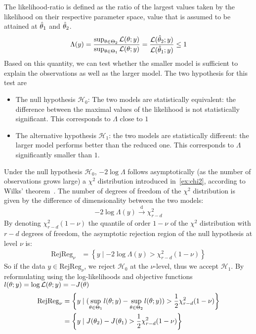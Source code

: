 \documentclass[../../Main_ManuscritThese.tex]{subfiles}
\begin{document}
The likelihood-ratio is defined as the ratio of the largest values
taken by the likelihood on their respective parameter space, value
that is assumed to be attained at $\hat{\theta}_1$ and $\hat{\theta}_2$.
\begin{equation}
  \label{eq:def_lik_ratio}
  \Lambda(y) = \frac{\sup_{\theta \in \Theta_2} \mathcal{L}(\theta ; y)}{\sup_{\theta \in \Theta_1} \mathcal{L}(\theta ; y)} = \frac{\mathcal{L}(\hat{\theta}_2 ; y)}{\mathcal{L}(\hat{\theta}_1 ; y)} \leq 1
\end{equation}
Based on this quantity, we can test whether the smaller model is
sufficient to explain the observations as well as the larger
model. The two hypothesis for this test are
\begin{itemize}
\item The null hypothesis $\mathcal{H}_0$: The two models are
  statistically equivalent: the difference between the maximal values
  of the likelihood is not statistically significant. This corresponds
  to $\Lambda$ close to $1$
\item The alternative hypothesis $\mathcal{H}_1$: the two models are
  statistically different: the larger model performs better than the
  reduced one. This corresponds to $\Lambda$ significantly smaller
  than $1$.
\end{itemize}
Under the null hypothesis $\mathcal{H}_0$, $-2 \log \Lambda$ follows
asymptotically (as the number of observations grows large) a $\chi^2$
distribution introduced in~\cref{ex:chi2}, according to Wilks'
theorem~\citep{wilks_large-sample_1938}. The number of degrees of
freedom of the $\chi^2$ distribution is given by the difference of
dimensionality between the two models:
\begin{equation}
  \label{eq:deviance_asymptotics}
  - 2 \log \Lambda(y) \xrightarrow[]{\mathrm{d}} \chi^2_{r-d}
\end{equation}
By denoting $\chi^2_{r-d}(1-\nu)$ the quantile of order $1-\nu$ of the
$\chi^2$ distribution with $r-d$ degrees of freedom, the asymptotic
rejection region of the null hypothesis at level $\nu$ is:
\begin{align}
  \mathrm{RejReg}_{\nu} &= \left\{y \mid -2 \log \Lambda(y) > \chi^2_{r-d}(1-\nu) \right\} \label{eq:LRT_rej_reg}
\end{align}
So if the data $y \in \mathrm{RejReg}_{\nu}$, we reject
$\mathcal{H}_0$ at the $\nu$-level, thus we accept $\mathcal{H}_1$.
By reformulating using the log-likelihoods and objective functions
$l(\theta;y) = \log \mathcal{L}(\theta;y) = - J(\theta)$
\begin{align}
  \mathrm{RejReg}_{\nu} &= \left\{ y \mid (\sup_{\theta\in\Theta_1} l(\theta;y) - \sup_{\theta\in\Theta_2} l(\theta;y)) > \frac12 \chi^2_{r-d}(1-\nu) \right\} \\
                             &= \left\{ y \mid J(\theta_2) - J(\theta_1) >  \frac12 \chi^2_{r-d}(1-\nu) \right\} \label{eq:rejreg_chi2}
\end{align}
\end{document}
